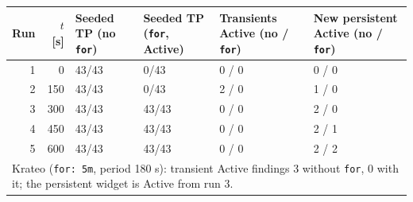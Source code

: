 \begin{tabular}{rrllll}
\toprule
Run & $t$ [s] & Seeded TP (no \texttt{for}) & Seeded TP (\texttt{for}, Active) & Transients Active (no / \texttt{for}) & New persistent Active (no / \texttt{for}) \\
\midrule
1 & 0 & 43/43 & 0/43 & 0 / 0 & 0 / 0 \\
2 & 150 & 43/43 & 0/43 & 2 / 0 & 1 / 0 \\
3 & 300 & 43/43 & 43/43 & 0 / 0 & 2 / 0 \\
4 & 450 & 43/43 & 43/43 & 0 / 0 & 2 / 1 \\
5 & 600 & 43/43 & 43/43 & 0 / 0 & 2 / 2 \\
\midrule
\multicolumn{6}{l}{Krateo (\texttt{for: 5m}, period 180 s): transient Active findings 3 without \texttt{for}, 0 with it; the persistent widget is Active from run 3.} \\
\bottomrule
\end{tabular}
